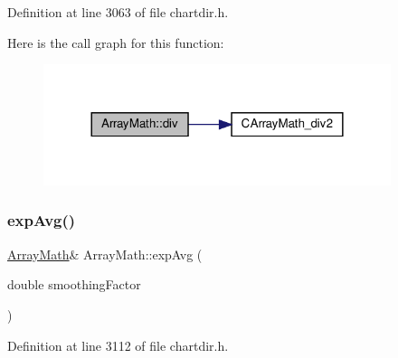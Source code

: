 Definition at line 3063 of file chartdir.\+h.

Here is the call graph for this function\+:
\nopagebreak
\begin{figure}[H]
\begin{center}
\leavevmode
\includegraphics[width=288pt]{class_array_math_a8ba4c3f4ec4a35cc310d97e2a647ad4c_cgraph}
\end{center}
\end{figure}
\mbox{\label{class_array_math_a2f9029cfd45e1094dd6aeb549bbcd107}} 
\subsubsection{\texorpdfstring{exp\+Avg()}{expAvg()}}
{\footnotesize\ttfamily \hyperlink{class_array_math}{Array\+Math}\& Array\+Math\+::exp\+Avg (\begin{DoxyParamCaption}\item[{double}]{smoothing\+Factor }\end{DoxyParamCaption})\hspace{0.3cm}{\ttfamily [inline]}}



Definition at line 3112 of file chartdir.\+h.


